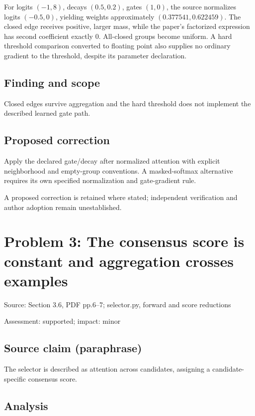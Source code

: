 \documentclass[11pt]{article}
\begin{document}
For logits \((-1,8)\), decays \((0.5,0.2)\), gates \((1,0)\), the source normalizes logits \((-0.5,0)\), yielding weights approximately \((0.377541,0.622459)\). The closed edge receives positive, larger mass, while the paper’s factorized expression has second coefficient exactly \(0\). All-closed groups become uniform. A hard threshold comparison converted to floating point also supplies no ordinary gradient to the threshold, despite its parameter declaration.

\subsection*{Finding and scope}

Closed edges survive aggregation and the hard threshold does not implement the described learned gate path.

\subsection*{Proposed correction}

Apply the declared gate/decay after normalized attention with explicit neighborhood and empty-group conventions. A masked-softmax alternative requires its own specified normalization and gate-gradient rule.

A proposed correction is retained where stated; independent verification and author adoption remain unestablished.

\section*{Problem 3: The consensus score is constant and aggregation crosses examples}

Source: Section 3.6, PDF pp.6–7; selector.py, forward and score reductions

Assessment: supported; impact: minor

\subsection*{Source claim (paraphrase)}

The selector is described as attention across candidates, assigning a candidate-specific consensus score.

\subsection*{Analysis}
\end{document}
